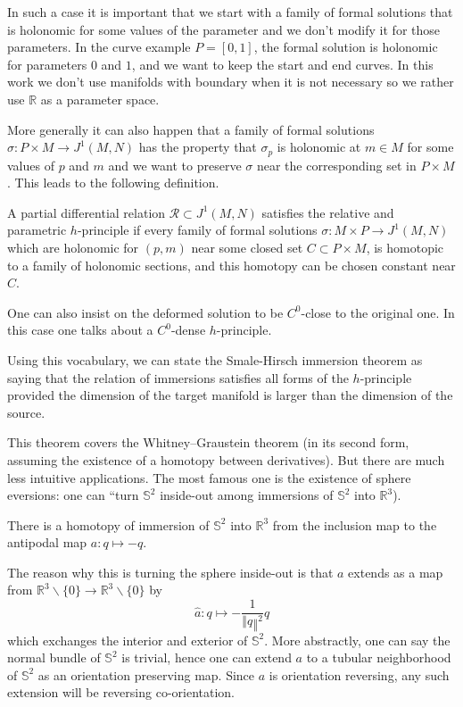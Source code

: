 \documentclass[10pt,a4paper]{article}
\newcommand{\co}{\!:}
\newcommand{\Rel}{\mathcal{R}} %
\begin{document}
In such a case it is important that we start with a family of formal solutions
that is holonomic for some values of the parameter and we don't modify it for
those parameters. In the curve example $P = [0, 1]$, the formal solution is
holonomic for parameters $0$ and $1$, and we want to keep the start and end
curves. In this work we don't use manifolds with boundary when it is not
necessary so we rather use $ℝ$ as a parameter space.

More generally it can also happen that a family of formal solutions
$σ : P × M → J^1(M, N)$ has the property that $σ_p$ is holonomic at $m ∈ M$ for
some values of $p$ and $m$ and we want to preserve $σ$ near the corresponding
set in $P × M$. This leads to the following definition.


\begin{definition-intro}
  A partial differential relation $\Rel ⊂ J^1(M, N)$ satisfies the relative and
  parametric $h$-principle if every family of formal solutions
  $σ \co M × P → J^1(M, N)$ which are holonomic for $(p, m)$ near some closed
  set $C ⊂ P × M$, is homotopic to a family of holonomic sections, and this
  homotopy can be chosen constant near $C$.
\end{definition-intro}

One can also insist on the deformed solution to be $C^0$-close to the original
one. In this case one talks about a $C^0$-dense $h$-principle.

Using this vocabulary, we can state the Smale-Hirsch immersion theorem as saying
that the relation of immersions satisfies all forms of the $h$-principle provided
the dimension of the target manifold is larger than the dimension of the source.

This theorem covers the Whitney--Graustein theorem (in its second
form, assuming the existence of a homotopy between derivatives). But there are
much less intuitive applications. The most famous one is the existence of
sphere eversions: one can ``turn $𝕊^2$ inside-out among immersions of $𝕊^2$ into
$ℝ^3$).

\begin{corollary-intro}[Smale 1958]
	There is a homotopy of immersion of $𝕊^2$ into $ℝ^3$ from the inclusion map to
	the antipodal map $a \co q ↦ -q$.
\end{corollary-intro}

The reason why this is turning the sphere inside-out is that $a$ extends as
a map from $ℝ^3 ∖ \{0\} → ℝ^3 ∖ \{0\}$ by
\[
	\hat{a} \co q ↦ -\frac{1}{‖q‖^2}q
\]
which exchanges the interior and exterior of $𝕊^2$. More abstractly, one can say
the normal bundle of $𝕊^2$ is trivial, hence one can extend $a$ to a tubular
neighborhood of $𝕊^2$ as an orientation preserving map. Since $a$ is orientation
reversing, any such extension will be reversing co-orientation.
\end{document}
